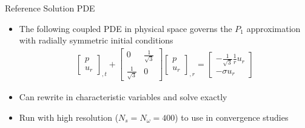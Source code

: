 \documentclass{beamer}
\begin{document}
\begin{frame}{Reference Solution PDE}
	\begin{itemize}
		\item The following coupled PDE in physical space governs the $P_{1}$ approximation with radially symmetric initial conditions
		\begin{align*}
		\begin{bmatrix}
		p \\
		u_{r}
		\end{bmatrix}_{, t} + 
		\begin{bmatrix}
		0 & \frac{1}{\sqrt{3}} \\
		\frac{1}{\sqrt{3}} & 0
		\end{bmatrix}
		\begin{bmatrix}
		p \\
		u_{r}
		\end{bmatrix}_{, r} = 
		\begin{bmatrix}
		-\frac{1}{\sqrt{3}} \frac{1}{r} u_{r} \\
		-\sigma u_{r}
		\end{bmatrix}
		\end{align*}
		\item Can rewrite in characteristic variables and solve exactly
		\item Run with high  resolution ($N_s = N_\omega = 400$) to use in convergence studies
	\end{itemize}    
\end{frame}
\end{document}
